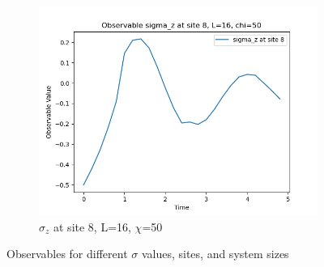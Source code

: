 \documentclass[12pt]{article}
\begin{document}
\begin{figure}[h!]
  \begin{subfigure}[b]{0.48\textwidth}
    \centering
    \includegraphics[width=\textwidth]{observable_sigma_z_site_8_L_16_chi_50.png}
    \caption{$\sigma_z$ at site 8, L=16, $\chi$=50}
  \end{subfigure}
  
  \caption{Observables for different $\sigma$ values, sites, and system sizes}
\end{figure}
\end{document}
